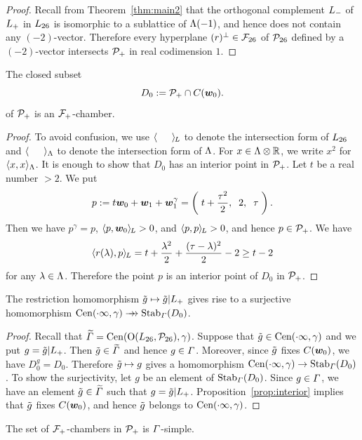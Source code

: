 \documentclass{amsart} %
\begin{document}
%
\begin{proof}
Recall from Theorem~\ref{thm:main2} that 
the orthogonal complement $L_{-}$
 of $L_{+}$ in $L_{26}$
is isomorphic to a sublattice of $\Lambda(-1)$,
and hence does not contain any $(-2)$-vector.
Therefore every hyperplane $(r)^{\perp}\in {\mathord{\mathcal{F}}}_{26}$ of $\mathord{\mathcal{P}}_{26}$ defined by a $(-2)$-vector 
intersects $\mathord{\mathcal{P}}_{+}$ in real codimension $1$.
\end{proof}
%
%
\begin{proposition}\label{prop:D0}
The closed subset 
\[
D_0:=\mathord{\mathcal{P}}_{+}\cap \mathord{C}(\boldsymbol{w}_0).
\]
of $\mathord{\mathcal{P}}_{+}$ is an $\mathord{\mathcal{F}}_{+}$-chamber.
\end{proposition}
%
\begin{proof}
To avoid confusion, we use $\langle \phantom{a, a} \rangle_{\hskip -1pt L}$ to denote the intersection form of $L_{26}$
and $\langle \phantom{a, a} \rangle_{\Lambda}$ to denote the intersection form of $\Lambda$.
For $x\in \Lambda\otimes\mathord{\mathbb{R}}$, we write $x^2$ for $\langle x,x \rangle_{\Lambda}$.
It is enough to show that $D_0$ has an interior point in $\mathord{\mathcal{P}}_{+}$.
Let $t$ be a real number $>2$.
We put
\[
p:=t\boldsymbol{w}_0+\boldsymbol{w}_1+\boldsymbol{w}_1^{\gamma}=\left(\; t+\frac{\tau^2}{2}, \;\;2, \;\; \tau\;\right).
\]
%
Then we have $p^{\gamma}=p$, $\langle p, \boldsymbol{w}_0 \rangle_{\hskip -1pt L}>0$,  and $\langle p, p \rangle_{\hskip -1pt L}>0$,
and hence $p\in \mathord{\mathcal{P}}_{+}$.
We have 
\[
\langle r(\lambda), p \rangle_{\hskip -1pt L}=t+\frac{\lambda^2}{2}+\frac{(\tau-\lambda)^2}{2}-2\ge t-2
\]
for any $\lambda\in \Lambda$.
Therefore the point $p$ is an interior point of $D_0$ in $\mathord{\mathcal{P}}_{+}$.
\end{proof}
%
\begin{proposition}\label{prop:CenStab}
The restriction homomorphism
$\tilde{g}\mapsto \tilde{g}|L_{+}$
gives rise to a surjective homomorphism 
$\mathrm{Cen}(\cdot \infty, \gamma)\mathrel{\rightarrow\!\!\!\!\rightarrow} \operatorname{Stab}_{\varGamma}(D_0)$.
\end{proposition}
%
\begin{proof}
Recall that 
$\widetilde{\varGamma}=\mathrm{Cen}(\mathord{\mathrm{O}}(L_{26}, \mathord{\mathcal{P}}_{26}), \gamma)$.
Suppose that $\tilde{g}\in \mathrm{Cen}(\cdot \infty, \gamma)$
and we put $g=\tilde{g}|L_{+}$.
Then  $\tilde{g}\in \widetilde{\varGamma}$ and hence $g\in \varGamma$.
Moreover,  since   $\tilde{g}$ fixes $\mathord{C}(\boldsymbol{w}_0)$,
we have  $D_0^g=D_0$.
Therefore $\tilde{g}\mapsto g$ gives  a homomorphism 
$\mathrm{Cen}(\cdot \infty, \gamma)\to\operatorname{Stab}_{\varGamma}(D_0)$.
To show the surjectivity,
let $g$ be an element of $\operatorname{Stab}_{\varGamma}(D_0)$.
Since $g\in \varGamma$,
we have an element $\tilde{g}\in \widetilde{\varGamma}$  such that $g=\tilde{g}|L_{+}$.
Proposition~\ref{prop:interior} implies  that $\tilde{g}$ fixes $\mathord{C}(\boldsymbol{w}_0)$,
and hence $\tilde{g}$ belongs to $\mathrm{Cen}(\cdot \infty, \gamma)$.
\end{proof}
%
\begin{proposition}\label{prop:PhiSimple}
The set of $\mathord{\mathcal{F}}_{+}$-chambers in $\mathord{\mathcal{P}}_{+}$ is $\varGamma$-simple.
\end{proposition}
\end{document}
